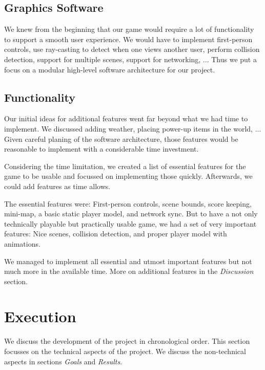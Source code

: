 \documentclass[11pt]{article}
\begin{document}
\subsection{Graphics Software}
\par We knew from the beginning that our game would require a lot of functionality to support a smooth user experience. We would have to implement first-person controls, use ray-casting to detect when one views another user, perform collision detection, support for multiple scenes, support for networking, ... Thus we put a focus on a modular high-level software architecture for our project.

\subsection{Functionality}
\par Our initial ideas for additional features went far beyond what we had time to implement. We discussed adding weather, placing power-up items in the world, ... Given careful planing of the software architecture, those features would be reasonable to implement with a considerable time investment.
\par Considering the time limitation, we created a list of essential features for the game to be usable and focussed on implementing those quickly. Afterwards, we could add features as time allows.
\par The essential features were: First-person controls, scene bounds, score keeping, mini-map, a basic static player model, and network sync. But to have a not only technically playable but practically usable game, we had a set of very important features: Nice scenes, collision detection, and proper player model with animations.
\par We managed to implement all essential and utmost important features but not much more in the available time. More on additional features in the \textit{Discussion} section.





\section{Execution}
\par We discuss the development of the project in chronological order. This section focusses on the technical aspects of the project. We discuss the non-technical aspects in sections \textit{Goals} and \textit{Results}.
\end{document}
